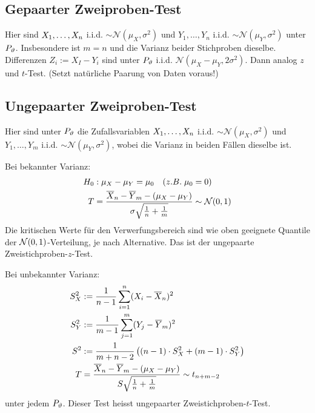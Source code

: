 \subsection{Gepaarter Zweiproben-Test}
Hier sind $X_1, \dots, X_n$ i.i.d. $\sim \mathcal{N} (\mu_X, \sigma^2)$ und
$Y_1, \dots, Y_n$ i.i.d. $\sim \mathcal{N} (\mu_Y, \sigma^2)$ unter $P_\vartheta$.
Insbesondere ist $m = n$ und die Varianz beider Stichproben dieselbe.
Differenzen $Z_i := X_I - Y_i$ sind unter $P_\vartheta$ i.i.d. $\mathcal{N} (\mu_X -
  \mu_Y, 2 \sigma^2)$. Dann analog $z$ und $t$-Test. (Setzt natürliche Paarung
von Daten voraus!)
\subsection{Ungepaarter Zweiproben-Test}
Hier sind unter $P_\vartheta$ die Zufallsvariablen $X_1, \dots, X_n$ i.i.d. $\sim
  \mathcal{N} (\mu_X, \sigma^2)$ und $Y_1, \dots, Y_m$ i.i.d. $\sim \mathcal{N}
  (\mu_Y, \sigma^2)$, wobei die Varianz in beiden Fällen dieselbe ist.
\begin{compactitem}
  \item Bei bekannter Varianz:
        \begin{align*}
          H_0 & : \mu_X - \mu_Y = \mu_0 \quad  (z.B. \; \mu_0 = 0)                                                                                \\
          T   & = \frac{\overline{X}_n - \overline{Y}_m -  (\mu_X - \mu_Y)}{\sigma \sqrt{\frac{1}{n} + \frac{1}{m}}} \sim \mathcal{N} (0, 1)
        \end{align*}
        Die kritischen Werte für den Verwerfungsbereich sind wie oben
        geeignete Quantile der $\mathcal{N} (0, 1)$-Verteilung, je nach
        Alternative. Das ist der ungepaarte Zweistichproben-$z$-Test.

  \item Bei unbekannter Varianz:
        \begin{align*}
          S_X^2 & := \frac{1}{n-1} \sum_{i = 1}^n  (X_i - \overline{X}_n)^2                                                                 \\
          S_Y^2 & := \frac{1}{m-1} \sum_{j = 1}^m  (Y_j - \overline{Y}_m)^2                                                      \\
          S^2   & := \frac{1}{m+n-2} \left(  (n-1) \cdot S_X^2 +  (m-1) \cdot S_Y^2 \right)                                      \\
          T     & = \frac{\overline{X}_n - \overline{Y}_m -  (\mu_X - \mu_Y)}{S \sqrt{\frac{1}{n} + \frac{1}{m}}} \sim t_{n+m-2}
        \end{align*}
        unter jedem $P_\vartheta$. Dieser Test heisst ungepaarter Zweistichproben-$t$-Test.
\end{compactitem}
